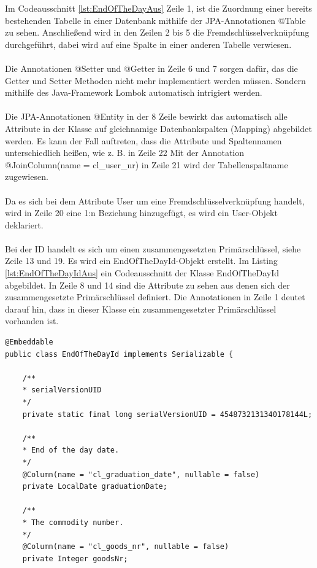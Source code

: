 Im Codeausschnitt \ref{lst:EndOfTheDayAus} Zeile 1, ist die Zuordnung einer bereits bestehenden Tabelle in einer Datenbank mithilfe der JPA-Annotationen @Table zu sehen. Anschließend wird in den Zeilen 2 bis 5 die Fremdschlüsselverknüpfung durchgeführt, dabei wird auf eine Spalte in einer anderen Tabelle verwiesen.
\\
\\
Die Annotationen @Setter und @Getter in Zeile 6 und 7 sorgen dafür, das die Getter und Setter Methoden nicht mehr implementiert werden müssen. Sondern mithilfe des Java-Framework Lombok automatisch intrigiert werden.
\\
\\
Die JPA-Annotationen @Entity in der 8 Zeile bewirkt das automatisch alle Attribute in der Klasse auf gleichnamige Datenbankspalten (Mapping) abgebildet werden. Es kann der Fall auftreten, dass die Attribute und Spaltennamen unterschiedlich heißen, wie z. B. in Zeile 22 Mit der Annotation @JoinColumn(name = \grqq{}cl\_user\_nr\grqq{}) in Zeile 21 wird der Tabellenspaltname zugewiesen.
\\
\\
Da es sich bei dem Attribute User um eine Fremdschlüsselverknüpfung handelt, wird in Zeile 20 eine 1:n Beziehung hinzugefügt, es wird ein User-Objekt deklariert.
\\
\\
Bei der ID handelt es sich um einen zusammengesetzten Primärschlüssel, siehe Zeile 13 und 19. Es wird ein EndOfTheDayId-Objekt erstellt. Im Listing \ref{lst:EndOfTheDayIdAus} ein Codeausschnitt der Klasse EndOfTheDayId abgebildet. In Zeile 8 und 14 sind die Attribute zu sehen aus denen sich der zusammengesetzte Primärschlüssel definiert. Die Annotationen in Zeile 1 deutet darauf hin, dass in dieser Klasse ein zusammengesetzter Primärschlüssel vorhanden ist.
\\
\lstset{language=java}
\begin{lstlisting}[frame=tb, caption={Das Listing zeigt einen Ausschnitt aus der Klasse EndOfTheDayId}, label={lst:EndOfTheDayIdAus}]
@Embeddable
public class EndOfTheDayId implements Serializable {
	
	/**
	* serialVersionUID
	*/
	private static final long serialVersionUID = 4548732131340178144L;
	
	/**
	* End of the day date.
	*/
	@Column(name = "cl_graduation_date", nullable = false)
	private LocalDate graduationDate;
	
	/**
	* The commodity number.
	*/
	@Column(name = "cl_goods_nr", nullable = false)
	private Integer goodsNr;
\end{lstlisting}

